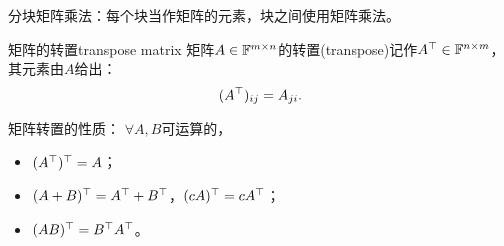 \begin{remark}
	分块矩阵乘法：每个块当作矩阵的元素，块之间使用矩阵乘法。
\end{remark}




\begin{definition}{矩阵的转置}{transpose matrix}
	矩阵$A\in\mathbb F^{m\times n}$的转置(transpose)记作$A^\top\in\mathbb F^{n\times m}$，其元素由$A$给出：
	\[
		(A^\top)_{ij}=A_{ji}.
	\]
\end{definition}
\begin{corollary}
	矩阵转置的性质：%
	$\forall A,B$可运算的，
	\begin{itemize}
		\item $(A^\top)^\top=A$；
		\item $(A+B)^\top=A^\top+B^\top$，$(cA)^\top=cA^\top$；
		\item $(AB)^\top=B^\top A^\top$。
	\end{itemize}
\end{corollary}


